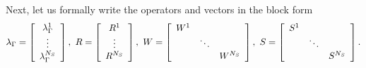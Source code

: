 Next, let us formally write the operators and vectors in the block form
\begin{equation}
\label{eq:block_operators}
\lambda_{\Gamma}=\left[
\begin{array}
[c]{c}%
\lambda_{\Gamma}^{1}\\
\vdots\\
\lambda_{\Gamma}^{N_{S}}%
\end{array}
\right]  ,\ R=\left[
\begin{array}
[c]{c}%
R^{1}\\
\vdots\\
R^{N_{S}}%
\end{array}
\right]  ,\ W=\left[
\begin{array}
[c]{ccc}%
W^{1} &  & \\
& \ddots & \\
&  & W^{N_{S}}%
\end{array}
\right]  ,\ S=\left[
\begin{array}
[c]{ccc}%
S^{1} &  & \\
& \ddots & \\
&  & S^{N_{S}}%
\end{array}
\right]  .
\end{equation}

